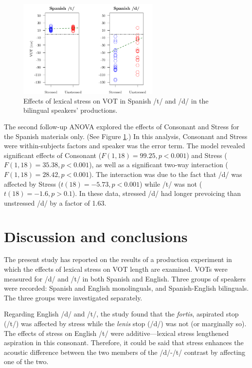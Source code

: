 \documentclass[a4paper]{article}
\begin{document}
	\begin{figure}
		\centering
		\caption[English]{Effects of lexical stress on VOT in Spanish /t/ and /d/ in the bilingual speakers' productions. \label{fig:span}}
		\includegraphics[width=70mm]{figures/bil_sp.pdf}
	\end{figure}

The second follow-up ANOVA explored the effects of Consonant and Stress for the Spanish materials only. (See Figure \ref{fig:span}.) In this analysis, Consonant and Stress were within-subjects factors and speaker was the error term. The model revealed significant effects of Consonant ($F(1,18) = 99.25, p < 0.001$) and Stress ($F(1,18) = 35.38, p < 0.001$), as well as a significant two-way interaction ($F(1,18) = 28.42, p < 0.001$). The interaction was due to the fact that /d/ was affected by Stress ($t(18) = -5.73, p < 0.001$) while /t/ was not ($t(18) = -1.6, p > 0.1$). In these data, stressed /d/ had longer prevoicing than unstressed /d/ by a factor of 1.63.

\section{Discussion and conclusions}

The present study has reported on the results of a production experiment in which the effects of lexical stress on VOT length are examined. VOTs were measured for /d/ and /t/ in both Spanish and English. Three groups of speakers were recorded: Spanish and English monolinguals, and Spanish-English bilinguals. The three groups were investigated separately.

Regarding English /d/ and /t/, the study found that the \emph{fortis}, aspirated stop (/t/) was affected by stress while the \emph{lenis} stop (/d/) was not (or marginally so). The effects of stress on English /t/ were additive---lexical stress lengthened aspiration in this consonant. Therefore, it could be said that stress enhances the acoustic difference between the two members of the /d/-/t/ contrast by affecting one of the two.
\end{document}
